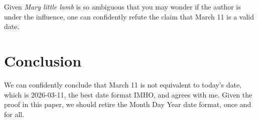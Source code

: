 \documentclass[12pt,longbibliography,draft]{article}
\begin{document}
Given \emph{Mary little lamb} is so ambiguous that you may wonder if the author is under the influence, one can confidently refute the claim that March 11 is a valid date. 

\section{Conclusion}
 
We can confidently conclude that March 11 is not equivalent to today's date, which is 2026-03-11, the best date format IMHO, and \citeauthor{ISO8601} agrees with me. Given the proof in this paper, we should retire the Month Day Year date format, once and for all.




\end{document}
